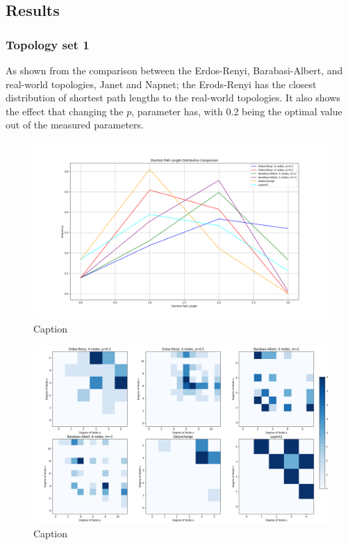 

\subsection{Results}


\subsubsection{Topology set 1}
As shown from the comparison between the Erdos-Renyi, Barabasi-Albert, and real-world topologies, Janet and Napnet; the Erods-Renyi has the closest distribution of shortest path lengths to the real-world topologies. It also shows the effect that changing the $p$, parameter has, with 0.2 being the optimal value out of the measured parameters. 

\begin{figure}
    \centering
    \includegraphics[width=0.9\linewidth]{images/FINAL-TOPO-COMP/line-6.png}
    \caption{Caption}
    \label{fig:enter-label}
\end{figure}

\begin{figure}
    \centering
    \includegraphics[width=0.9\linewidth]{images/FINAL-TOPO-COMP/Degree-correlation-matrices/6-matrix.png}
    \caption{Caption}
    \label{fig:enter-label}
\end{figure}

